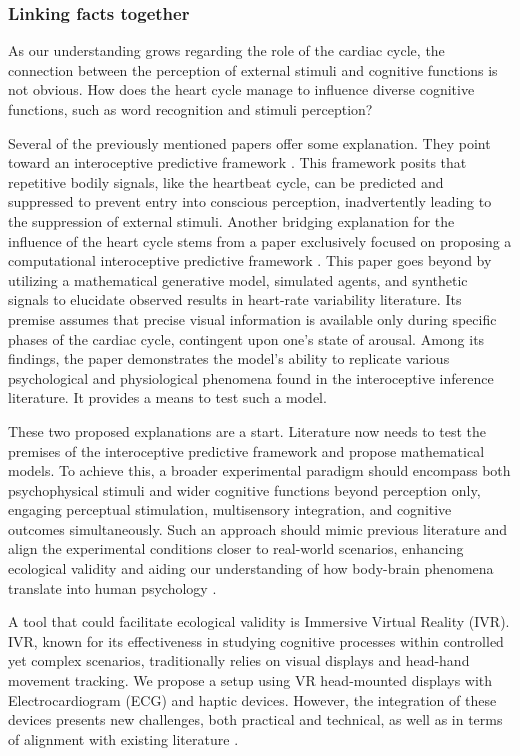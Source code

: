 \documentclass[12pt,oneside,openright]{report}
\begin{document}
\subsubsection*{Linking facts together}

As our understanding grows regarding the role of the cardiac cycle, the connection between the perception of external stimuli and cognitive functions is not obvious. How does the heart cycle manage to influence diverse cognitive functions, such as word recognition and stimuli perception?

Several of the previously mentioned papers offer some explanation. They point toward an interoceptive predictive framework \parencite{AL2021118247, SALTAFOSSI2023108642}. This framework posits that repetitive bodily signals, like the heartbeat cycle, can be predicted and suppressed to prevent entry into conscious perception, inadvertently leading to the suppression of external stimuli. Another bridging explanation for the influence of the heart cycle stems from a paper exclusively focused on proposing a computational interoceptive predictive framework \parencite{Allen2022}. This paper goes beyond by utilizing a mathematical generative model, simulated agents, and synthetic signals to elucidate observed results in heart-rate variability literature. Its premise assumes that precise visual information is available only during specific phases of the cardiac cycle, contingent upon one's state of arousal. Among its findings, the paper demonstrates the model's ability to replicate various psychological and physiological phenomena found in the interoceptive inference literature. It provides a means to test such a model.

These two proposed explanations are a start. Literature now needs to test the premises of the interoceptive predictive framework and propose mathematical models. To achieve this, a broader experimental paradigm should encompass both psychophysical stimuli and wider cognitive functions beyond perception only, engaging perceptual stimulation, multisensory integration, and cognitive outcomes simultaneously. Such an approach should mimic previous literature and align the experimental conditions closer to real-world scenarios, enhancing ecological validity and aiding our understanding of how body-brain phenomena translate into human psychology \parencite{schmuckler2001ecological}.

A tool that could facilitate ecological validity is Immersive Virtual Reality (IVR). IVR, known for its effectiveness in studying cognitive processes within controlled yet complex scenarios, traditionally relies on visual displays and head-hand movement tracking. We propose a setup using VR head-mounted displays with Electrocardiogram (ECG) and haptic devices. However, the integration of these devices presents new challenges, both practical and technical, as well as in terms of alignment with existing literature \parencite{Klotzsche2023}. 
\end{document}

